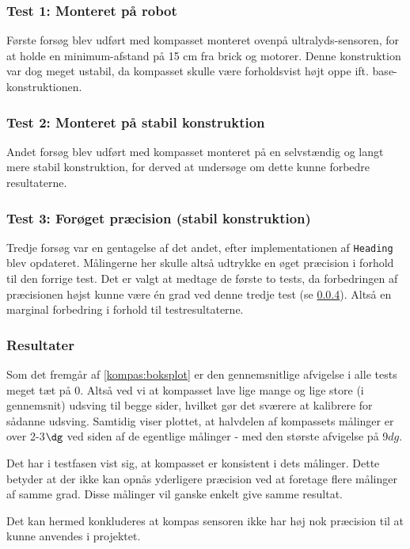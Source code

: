 \subsubsection{Test 1: Monteret på robot}
Første forsøg blev udført med kompasset monteret ovenpå ultralyds-sensoren, for at holde en minimum-afstand på 15 cm fra brick og motorer.
Denne konstruktion var dog meget ustabil, da kompasset skulle være forholdsvist højt oppe ift. base-konstruktionen.

\subsubsection{Test 2: Monteret på stabil konstruktion}
Andet forsøg blev udført med kompasset monteret på en selvstændig og langt mere stabil konstruktion, for derved at undersøge om dette kunne forbedre resultaterne.

\subsubsection{Test 3: Forøget præcision (stabil konstruktion)}
Tredje forsøg var en gentagelse af det andet, efter implementationen af \lstinline[style=csharp]!Heading! blev opdateret.
Målingerne her skulle altså udtrykke en øget præcision i forhold til den forrige test.
Det er valgt at medtage de første to tests, da forbedringen af præcisionen højst kunne være \'en grad ved denne tredje test (se \cref{}).
Altså en marginal forbedring i forhold til testresultaterne.

\subsubsection{Resultater}
Som det fremgår af \cref{kompas:boksplot} er den gennemsnitlige afvigelse i alle tests meget tæt på 0.
Altså ved vi at kompasset lave lige mange og lige store (i gennemsnit) udsving til begge sider, hvilket gør det sværere at kalibrere for sådanne udsving.
Samtidig viser plottet, at halvdelen af kompassets målinger er over 2-3$\dg$ ved siden af de egentlige målinger - med den største afvigelse på 9$dg$.

Det har i testfasen vist sig, at kompasset er konsistent i dets målinger.
Dette betyder at der ikke kan opnås yderligere præcision ved at foretage flere målinger af samme grad.
Disse målinger vil ganske enkelt give samme resultat.

Det kan hermed konkluderes at kompas sensoren ikke har høj nok præcision til at kunne anvendes i projektet.
